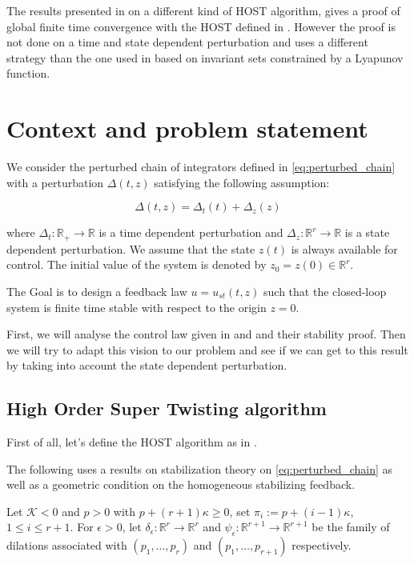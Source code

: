 The results presented in \cite{Laghrouche2017} on a different kind of HOST algorithm, gives a proof
of global finite time convergence with the HOST defined in \cite{Hong2005}. However the proof is
not done on a time and state dependent perturbation and uses a different strategy than the one used in
\cite{khalil2002nonlinear} based on invariant sets constrained by a Lyapunov function.


\newpage
\section{Context and problem statement}

We consider the perturbed chain of integrators defined in \eqref{eq:perturbed_chain} with a perturbation
$\Delta(t,z)$ satisfying the following assumption:

\begin{equation}
    \label{eq:assumption_perturbation_sum}
    \Delta(t,z) = \Delta_t(t) + \Delta_z(z)
\end{equation}

where $\Delta_t: \mathbb{R}_+ \to \mathbb{R}$ is a time dependent perturbation and 
$\Delta_z: \mathbb{R}^r \to \mathbb{R}$ is a state dependent perturbation. We assume that the state \(z(t)\) 
is always available for control. The initial value of the system is denoted by \(z_0 = z(0) \in \mathbb{R}^r\). 

The Goal is to design a feedback law \(u = u_{st}(t,z)\) such that the closed-loop system is finite time stable
with respect to the origin \(z = 0\).

First, we will analyse the control law given in \cite{Laghrouche2017} and \cite{Hong2005} and their stability
proof. Then we will try to adapt this vision to our problem and see if we can get to this result by 
taking into account the state dependent perturbation.

\subsection{High Order Super Twisting algorithm}

First of all, let's define the HOST algorithm as in \cite{Laghrouche2017}.

The following uses a results on stabilization theory on \ref{eq:perturbed_chain} as well as a geometric condition on the
homogeneous stabilizing feedback.

Let \(\mathcal{K} < 0\) and \(p > 0\) with \( p + (r + 1)\kappa \geq 0 \), set 
\( \pi_i := p + (i - 1)\kappa \), \( 1 \leq i \leq r + 1 \). For \( \epsilon > 0 \), let 
\( \delta_{\epsilon} : \mathbb{R}^r \rightarrow \mathbb{R}^r \) and \( \psi_{\epsilon} :
 \mathbb{R}^{r+1} \rightarrow \mathbb{R}^{r+1} \) be the family of dilations associated 
 with \( (p_1, \ldots, p_r) \) and \( (p_1, \ldots, p_{r+1}) \) respectively.


